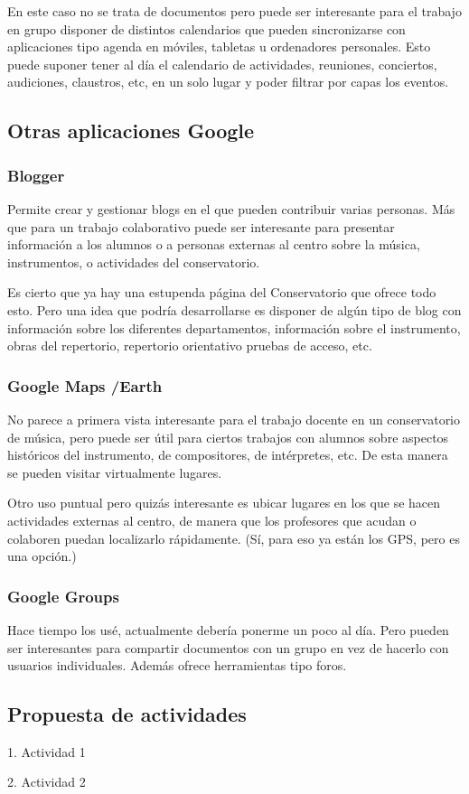\documentclass{article}
\begin{document}
En este caso no se trata de documentos pero puede ser interesante para el trabajo en grupo disponer de distintos
calendarios que pueden sincronizarse con aplicaciones tipo agenda en móviles, tabletas u ordenadores personales. Esto
puede suponer tener al día el calendario de actividades, reuniones, conciertos, audiciones, claustros, etc, en un solo
lugar y poder filtrar por capas los eventos. 

\subsection{Otras aplicaciones Google}

\subsubsection{Blogger}

Permite crear y gestionar blogs en el que pueden contribuir varias personas. Más que para un trabajo colaborativo puede
ser interesante para presentar información a los alumnos o a personas externas al centro sobre la música, instrumentos,
o actividades del conservatorio. 

Es cierto que ya hay una estupenda página del Conservatorio que ofrece todo esto. Pero una idea que podría desarrollarse
es disponer de algún tipo de blog con información sobre los diferentes departamentos, información sobre el instrumento,
obras del repertorio, repertorio orientativo pruebas de acceso, etc. 

\subsubsection{Google Maps /Earth}

No parece a primera vista interesante para el trabajo docente en un conservatorio de música, pero puede ser útil para
ciertos trabajos con alumnos sobre aspectos históricos del instrumento, de compositores, de intérpretes, etc. De esta
manera se pueden visitar virtualmente lugares. 

Otro uso puntual pero quizás interesante es ubicar lugares en los que se hacen actividades externas al centro, de manera
que los profesores que acudan o colaboren puedan localizarlo rápidamente. (Sí, para eso ya están los GPS, pero es una
opción.)

\subsubsection{Google Groups}

Hace tiempo los usé, actualmente debería ponerme un poco al día. Pero pueden ser interesantes para compartir documentos
con un grupo en vez de hacerlo con usuarios individuales. Además ofrece herramientas tipo foros. 

\subsection{Propuesta de actividades}

1. Actividad 1

2. Actividad 2
\end{document}
